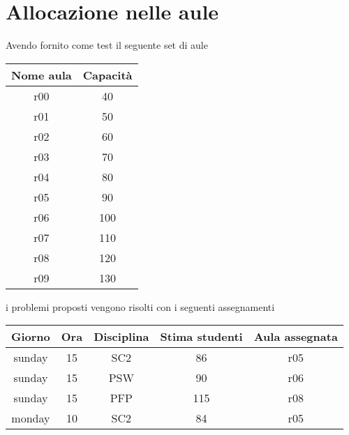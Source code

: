 \newpage

\section{Allocazione nelle aule}

Avendo fornito come test il seguente set di aule

\begin{table}[h]
    \begin{small}
        \begin{center}
            \begin{tabular}[c]{c|c}
                Nome aula & Capacità \\
                \hline
                r00 & 40 \\
                r01 & 50 \\
                r02 & 60 \\
                r03 & 70 \\
                r04 & 80 \\
                r05 & 90 \\
                r06 & 100 \\
                r07 & 110 \\
                r08 & 120 \\
                r09 & 130 
            \end{tabular}
        \end{center}
    \end{small}
\end{table}

\noindent
i problemi proposti vengono risolti con i seguenti assegnamenti

\begin{table}[h]
    \begin{small}
        \begin{center}
            \begin{tabular}[c]{c|c|c|c|c}
                Giorno & Ora & Disciplina & Stima studenti & Aula assegnata \\
                \hline
                sunday & 15 & SC2 & 86 & r05 \\
                sunday & 15 & PSW & 90 & r06 \\
                sunday & 15 & PFP & 115 & r08 \\
                monday & 10 & SC2 & 84 & r05
            \end{tabular}
        \end{center}
    \end{small}
\end{table}
